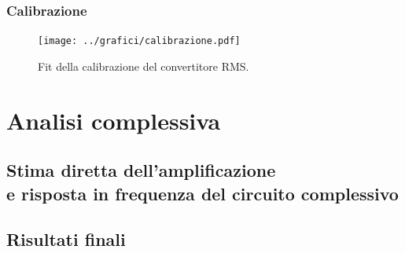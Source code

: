 \documentclass[a4paper,10pt]{article}
\begin{document}
\lipsum[2-5]

\subsubsection*{Calibrazione}

\lipsum[4]

\begin{figure}[H]
	\centering
	\texttt{[image: ../grafici/calibrazione.pdf]}
	\vspace*{10pt}
	\caption{Fit della calibrazione del convertitore RMS.}
	\label{fig:blocks}
\end{figure}

\section{Analisi complessiva} %

\subsection{Stima diretta dell'amplificazione \\e risposta in frequenza del circuito complessivo}

\lipsum[8]

\subsection{Risultati finali}

\lipsum[9]
\end{document}

